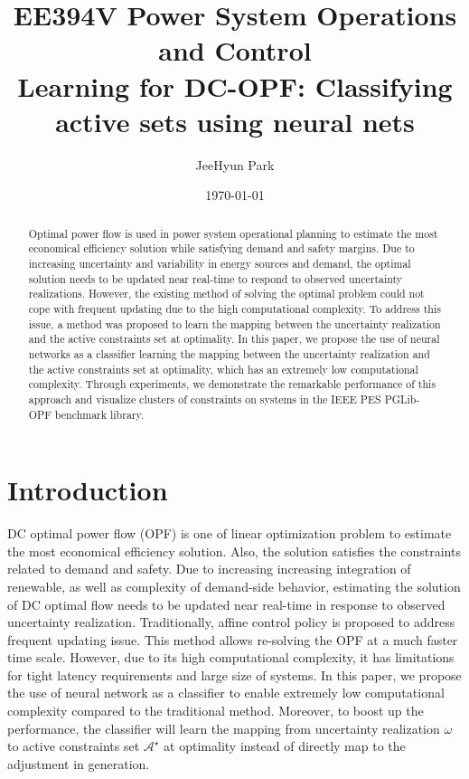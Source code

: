 \documentclass[11pt]{article}
\begin{document}
\title{\bf EE394V Power System Operations and Control\\
Learning for DC-OPF: Classifying active sets using neural nets 
}
\date{\today}
\author{JeeHyun Park}
\maketitle
\begin{abstract}
Optimal power flow is used in power system operational planning to estimate the most economical efficiency solution while satisfying demand and safety margins. Due to increasing uncertainty and variability in energy sources and demand, the optimal solution needs to be updated near real-time to respond to observed uncertainty realizations. However, the existing method of solving the optimal problem could not cope with frequent updating due to the high computational complexity. To address this issue, a method was proposed to learn the mapping between the uncertainty realization and the active constraints set at optimality. In this paper, we propose the use of neural networks as a classifier learning the mapping between the uncertainty realization and the active constraints set at optimality, which has an extremely low computational complexity. Through experiments, we demonstrate the remarkable performance of this approach and visualize clusters of constraints on systems in the IEEE PES PGLib-OPF benchmark library.
\end{abstract}



\section{Introduction}\label{sec:intro}
DC optimal power flow (OPF) is one of linear optimization problem to estimate the most economical efficiency solution. Also, the solution satisfies the constraints related to demand and safety. Due to increasing increasing integration of renewable, as well as complexity of demand-side behavior, estimating the solution of DC optimal flow needs to be updated near real-time in response to observed uncertainty realization. Traditionally, affine control policy is proposed to address frequent updating issue. This method allows re-solving the OPF at a much faster time scale. However, due to its high computational complexity, it has limitations for tight latency requirements and large size of systems. In this paper, we propose the use of neural network as a classifier to enable extremely low computational complexity compared to the traditional method. Moreover, to boost up the performance, the classifier will learn the mapping from uncertainty realization $\omega$ to active constraints set $\mathcal{A^{\star}}$ at optimality instead of directly map to the adjustment in generation.
\end{document}
